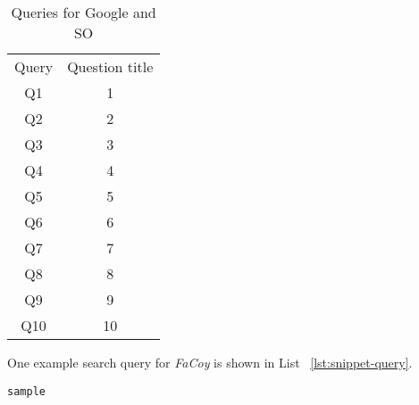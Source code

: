 \begin{table}
	\begin{center}
		\begin{tabular}{ c|c } 
			Query & Question title \\ 
			Q1 &  1\\\hline 
			Q2 &  2 \\ \hline
			Q3 &  3 \\ \hline
			Q4 &  4 \\ \hline
			Q5 &  5 \\ \hline
			Q6 &  6 \\ \hline
			Q7 &  7	\\ \hline
			Q8 &  8	\\ \hline
			Q9 &  9	\\ \hline
			Q10 & 10\\ \hline
		\end{tabular}		
	\end{center}
	\caption{Queries for Google and SO}
	\label{tab:so-questions}
\end{table}

One example search query for \textit{FaCoy} is shown in List ~\ref{lst:snippet-query}.
\begin{lstlisting}[label={lst:snippet-query}]
	sample
\end{lstlisting}
